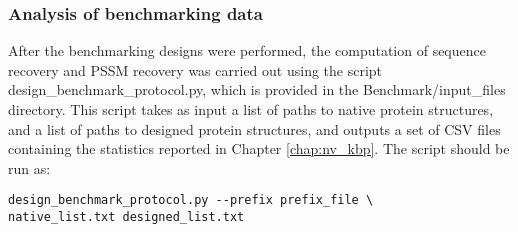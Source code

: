 \subsubsection{Analysis of benchmarking data}

After the benchmarking designs were performed, the computation of sequence recovery and PSSM recovery was carried out using the script design\_benchmark\_protocol.py, which is provided in the Benchmark/input\_files directory.
This script takes as input a list of paths to native protein structures, and a list of paths to designed protein structures, and outputs a set of CSV files containing the statistics reported in Chapter \ref{chap:nv_kbp}.
The script should be run as:

\singlespace
\begin{Verbatim}
design_benchmark_protocol.py --prefix prefix_file \
native_list.txt designed_list.txt
\end{Verbatim}
\doublespace
